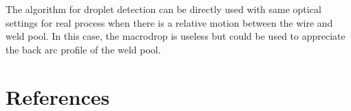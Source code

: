 \documentclass[12pt]{iopart}
\begin{document}
The algorithm for droplet detection can be directly used with same optical settings for real 
process when there is a relative motion between the wire and weld pool. In this case, the macrodrop
is useless but could be used to appreciate the back arc profile of the weld pool.


\section{References}



\end{document}
